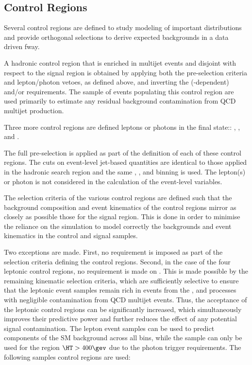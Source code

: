 \subsection{Control Regions}

Several control regions are defined to study modeling of important distributions and provide
orthogonal selections to derive expected backgrounds in a data driven fway.


A hadronic control region that is enriched in multijet events and
disjoint with respect to the signal region is obtained by applying both the pre-selection criteria and lepton/photon vetoes, as defined
above, and inverting the (\HT-dependent) \alphat and/or \mhtmet requirements. 
The sample of events populating this control region are used primarily to estimate any residual background contamination from QCD multijet production.

Three more control regions are defined leptons or photons in the final state:: \mj, \mmj, and \gj. 

The full pre-selection is applied as part of the definition of each of these control regions. The cuts on event-level jet-based quantities are identical to
those applied in the hadronic search region and the same \njet, \nb, and \scalht binning is used. The lepton(s) or photon is not considered
in the calculation of the event-level variables.

The selection criteria of the various control regions are defined such that the background composition and event kinematics of the control
regions mirror as closely as possible those for the signal region. This is done in order to minimise the reliance on the simulation to model correctly the backgrounds and event kinematics in
the control and signal samples.

Two exceptions are made. First, no \bdphi requirement is imposed as part of the selection criteria defining the control regions. Second,
in the case of the four leptonic control regions, no requirement is made on \alphat. This is made possible by the remaining kinematic
selection criteria, which are sufficiently selective to ensure that the leptonic event samples remain rich in events from the \wj, \ttbar
and \zll processes with negligible contamination from QCD multijet events. Thus, the acceptance of the leptonic control regions can be
significantly increased, which simultaneously improves their predictive power and further reduces the effect of any potential
signal contamination.
The lepton event samples can be used to predict components of the SM background across all \scalht bins, while the \gj sample can only be
used for the region $\HT > 400\gev$ due to the photon trigger requirements. The following samples control regions are used:

